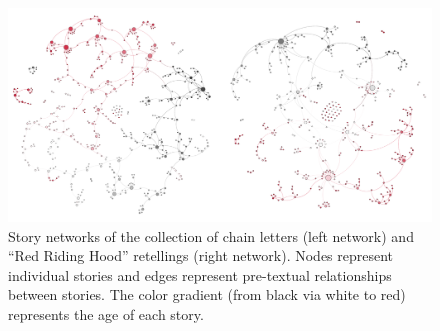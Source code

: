 \begin{figure}
\centering
\includegraphics[width=\textwidth]{images/graphs.pdf}
\caption{Story networks of the collection of chain letters (left network) and ``Red Riding Hood'' retellings (right network). Nodes represent individual stories and edges represent pre-textual relationships between stories. The color gradient (from black via white to red) represents the age of each story.}
\label{fig:network-visualization}
\end{figure}


